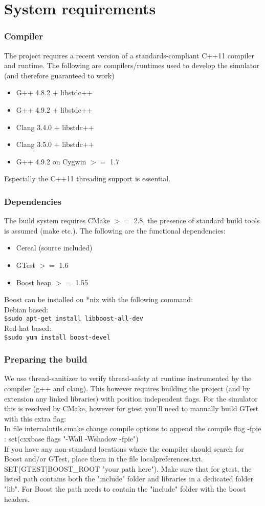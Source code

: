 \section{System requirements}
\subsubsection{Compiler}
The project requires a recent version of a standards-compliant C++11 compiler and runtime. The following are compilers/runtimes used to develop the simulator (and therefore guaranteed to work)
\begin{itemize}
  \item G++ 4.8.2 + libstdc++
  \item G++ 4.9.2 + libstdc++
  \item Clang 3.4.0 + libstdc++
  \item Clang 3.5.0 + libstdc++
  \item G++ 4.9.2 on Cygwin $>=$ 1.7
\end{itemize}
Especially the C++11 threading support is essential.
\subsubsection{Dependencies}
The build system requires CMake $>=$ 2.8, the presence of standard build tools is assumed (make etc.).
The following are the functional dependencies:
\begin{itemize}
  \item Cereal (source included)
  \item GTest $>=$ 1.6
  \item Boost heap $>=$ 1.55  
\end{itemize}
Boost can be installed on *nix with the following command:\\
Debian based:\\
\lstinline!$sudo apt-get install libboost-all-dev!\\
Red-hat based:\\
\lstinline!$sudo yum install boost-devel!\\
\subsubsection{Preparing the build}
We use thread-sanitizer to verify thread-safety at runtime instrumented by the compiler (g++ and clang). This however requires building the project (and by extension any linked libraries) with position independent flags. For the simulator this is resolved by CMake, however for gtest you'll need to manually build GTest with this extra flag:\\
In file internal\textunderscore utils.cmake change compile options to append the compile flag -fpie :
set(cxx\textunderscore base \textunderscore flags "-Wall -Wshadow -fpie")\\
If you have any non-standard locations where the compiler should search for Boost and/or GTest, place them in the file localpreferences.txt.\\
SET({GTEST|BOOST}\_ROOT "your path here"). Make sure that for gtest, the listed path contains both the "include" folder and libraries in a dedicated folder "lib". For Boost the path needs to contain the "include" folder with the boost headers.
